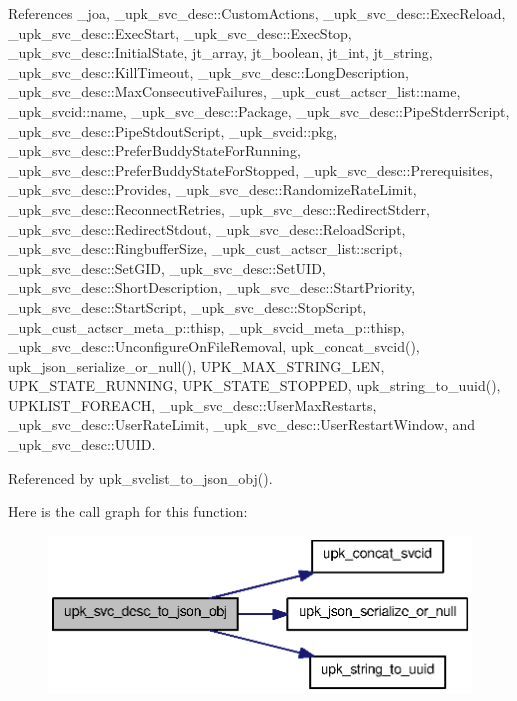 References \_\-joa, \_\-upk\_\-svc\_\-desc::CustomActions, \_\-upk\_\-svc\_\-desc::ExecReload, \_\-upk\_\-svc\_\-desc::ExecStart, \_\-upk\_\-svc\_\-desc::ExecStop, \_\-upk\_\-svc\_\-desc::InitialState, jt\_\-array, jt\_\-boolean, jt\_\-int, jt\_\-string, \_\-upk\_\-svc\_\-desc::KillTimeout, \_\-upk\_\-svc\_\-desc::LongDescription, \_\-upk\_\-svc\_\-desc::MaxConsecutiveFailures, \_\-upk\_\-cust\_\-actscr\_\-list::name, \_\-upk\_\-svcid::name, \_\-upk\_\-svc\_\-desc::Package, \_\-upk\_\-svc\_\-desc::PipeStderrScript, \_\-upk\_\-svc\_\-desc::PipeStdoutScript, \_\-upk\_\-svcid::pkg, \_\-upk\_\-svc\_\-desc::PreferBuddyStateForRunning, \_\-upk\_\-svc\_\-desc::PreferBuddyStateForStopped, \_\-upk\_\-svc\_\-desc::Prerequisites, \_\-upk\_\-svc\_\-desc::Provides, \_\-upk\_\-svc\_\-desc::RandomizeRateLimit, \_\-upk\_\-svc\_\-desc::ReconnectRetries, \_\-upk\_\-svc\_\-desc::RedirectStderr, \_\-upk\_\-svc\_\-desc::RedirectStdout, \_\-upk\_\-svc\_\-desc::ReloadScript, \_\-upk\_\-svc\_\-desc::RingbufferSize, \_\-upk\_\-cust\_\-actscr\_\-list::script, \_\-upk\_\-svc\_\-desc::SetGID, \_\-upk\_\-svc\_\-desc::SetUID, \_\-upk\_\-svc\_\-desc::ShortDescription, \_\-upk\_\-svc\_\-desc::StartPriority, \_\-upk\_\-svc\_\-desc::StartScript, \_\-upk\_\-svc\_\-desc::StopScript, \_\-upk\_\-cust\_\-actscr\_\-meta\_\-p::thisp, \_\-upk\_\-svcid\_\-meta\_\-p::thisp, \_\-upk\_\-svc\_\-desc::UnconfigureOnFileRemoval, upk\_\-concat\_\-svcid(), upk\_\-json\_\-serialize\_\-or\_\-null(), UPK\_\-MAX\_\-STRING\_\-LEN, UPK\_\-STATE\_\-RUNNING, UPK\_\-STATE\_\-STOPPED, upk\_\-string\_\-to\_\-uuid(), UPKLIST\_\-FOREACH, \_\-upk\_\-svc\_\-desc::UserMaxRestarts, \_\-upk\_\-svc\_\-desc::UserRateLimit, \_\-upk\_\-svc\_\-desc::UserRestartWindow, and \_\-upk\_\-svc\_\-desc::UUID.



Referenced by upk\_\-svclist\_\-to\_\-json\_\-obj().



Here is the call graph for this function:
\nopagebreak
\begin{figure}[H]
\begin{center}
\leavevmode
\includegraphics[width=344pt]{group__config__impl_ga02e5b971c150fa74691e14f94b6ee291_cgraph}
\end{center}
\end{figure}




